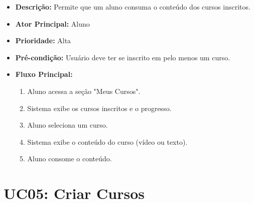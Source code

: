         \begin{itemize}
            \item \textbf{Descrição:} Permite que um aluno consuma o conteúdo dos cursos inscritos.
            
            \item \textbf{Ator Principal:} Aluno
            
            \item \textbf{Prioridade:} Alta
            
            \item \textbf{Pré-condição:} Usuário deve ter se inscrito em pelo menos um curso.
            
            \item \textbf{Fluxo Principal:}
            \begin{enumerate}
                \item Aluno acessa a seção "Meus Cursos".
                \item Sistema exibe os cursos inscritos e o progresso.
                \item Aluno seleciona um curso.
                \item Sistema exibe o conteúdo do curso (vídeo ou texto).
                \item Aluno consome o conteúdo.
            \end{enumerate}
        \end{itemize}

        \section*{UC05: Criar Cursos}

